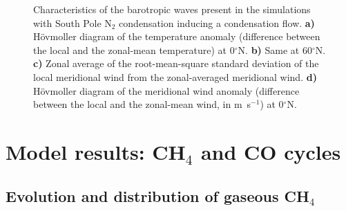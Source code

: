 \begin{figure}
\begin{center}
\begin{tabular}[h]{ll}
\end{tabular}
    \caption{
\label{fg:waves}
Characteristics of the barotropic waves present in the simulations with South Pole N$_2$ condensation
inducing a condensation flow. {\bf a)} H\"ovmoller diagram of the temperature anomaly (difference between
the local and the zonal-mean temperature) at 0$^\circ$N. {\bf b)} Same at 60$^\circ$N.
{\bf c)} Zonal average of the root-mean-square standard deviation of the local 
 meridional wind from the zonal-averaged meridional wind.
{\bf d)}  H\"ovmoller diagram of the meridional wind anomaly (difference between
the local and the zonal-mean wind, in m~s$^{-1}$) at 0$^\circ$N. 
}
  \end{center}
\end{figure}



\section{Model results: CH$_4$ and CO cycles }
\label{sc:ch4_co_results}



\subsection{Evolution and distribution of gaseous CH$_4$}

\label{sc:ch4_results}



